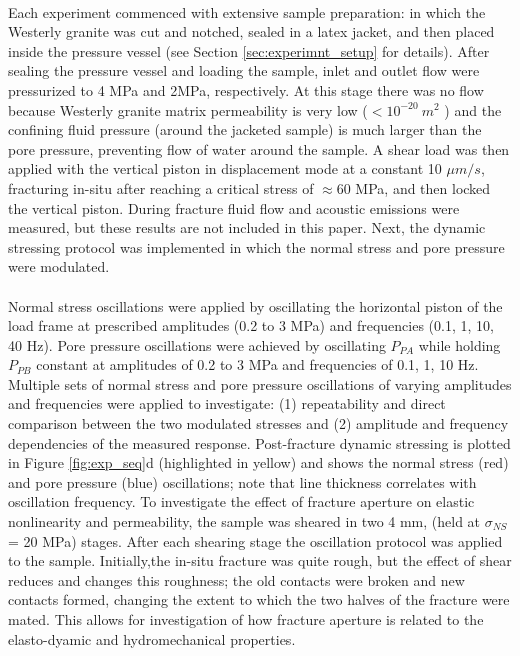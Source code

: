 \paragraph{}
Each experiment commenced with extensive sample preparation: in which the Westerly granite was cut and notched, sealed in a latex jacket, and then placed inside the pressure vessel (see Section \ref{sec:experimnt_setup} for details). After sealing the pressure vessel and loading the sample, inlet and outlet flow were pressurized to 4 MPa and 2MPa, respectively. At this stage there was no flow because Westerly granite matrix permeability is very low ($< 10^{-20}\ m^2$ ) and the confining fluid pressure (around the jacketed sample) is much larger than the pore pressure, preventing flow of water around the sample.
A shear load was then applied with the vertical piston in displacement mode at a constant 10 $\mu m/s$, fracturing in-situ after reaching a critical stress of $ \approx $60 MPa, and then locked the vertical piston. During fracture fluid flow and acoustic emissions were measured, but these results are not included in this paper. Next, the dynamic stressing protocol was implemented in which the normal stress and pore pressure were modulated. 
\paragraph{}
Normal stress oscillations were applied by oscillating the horizontal piston of the load frame at prescribed amplitudes (0.2 to 3 MPa) and frequencies (0.1, 1, 10, 40 Hz). Pore pressure oscillations were achieved by oscillating $P_{PA}$ while holding $P_{PB}$ constant at amplitudes of 0.2 to 3 MPa and frequencies of 0.1, 1, 10 Hz. Multiple sets of normal stress and pore pressure oscillations of varying amplitudes and frequencies were applied to investigate: (1) repeatability and direct comparison between the two modulated stresses and (2) amplitude and frequency dependencies of the measured response. Post-fracture dynamic stressing is plotted in Figure \ref{fig:exp_seq}d (highlighted in yellow) and shows the normal stress (red) and pore pressure (blue) oscillations; note that line thickness correlates with oscillation frequency. 
To investigate the effect of fracture aperture on elastic nonlinearity and permeability, the sample was sheared in two 4 mm, (held at $ \sigma_{NS} $ = 20 MPa) stages. After each shearing stage the oscillation protocol was applied to the sample. Initially,the in-situ fracture was quite rough, but the effect of shear reduces and changes this roughness; the old contacts were broken and new contacts formed, changing the extent to which the two halves of the fracture were mated. This allows for investigation of how fracture aperture is related to the elasto-dyamic and hydromechanical properties. 

